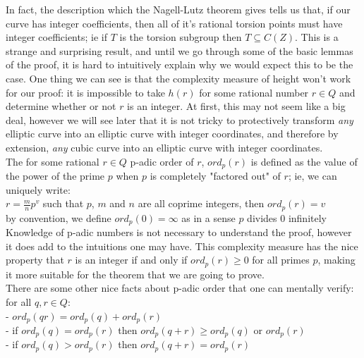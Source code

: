 \documentclass{article}
\begin{document}
In fact, the description which the Nagell-Lutz theorem gives tells us that, if our curve has integer coefficients, then all of it's rational torsion points must have integer coefficients; ie if $T$ is the torsion subgroup then $T \subseteq C(Z)$. This is a strange and surprising result, and until we go through some of the basic lemmas of the proof, it is hard to intuitively explain why we would expect this to be the case. One thing we can see is that the complexity measure of height won't work for our proof: it is impossible to take $h(r)$ for some rational number $r \in Q$ and determine whether or not $r$ is an integer. At first, this may not seem like a big deal, however we will see later that it is not tricky to protectively transform \emph{any} elliptic curve into an elliptic curve with integer coordinates, and therefore by extension, \emph{any} cubic curve into an elliptic curve with integer coordinates.\\

The for some rational $r \in Q$ p-adic order of $r$, $ord_p(r)$ is defined as the value of the power of the prime $p$ when $p$ is completely "factored out" of $r$; ie, we can uniquely write:\\

$r = \frac{m}{n}p^v$ such that $p$, $m$ and $n$ are all coprime integers, then $ord_p(r) = v$\\

by convention, we define $ord_p(0) = \infty$ as in a sense $p$ divides $0$ infinitely\\

Knowledge of p-adic numbers is not necessary to understand the proof, however it does add to the intuitions one may have. This complexity measure has the nice property that $r$ is an integer if and only if $ord_p(r) \geq 0$ for all primes $p$, making it more suitable for the theorem that we are going to prove. \\

There are some other nice facts about p-adic order that one can mentally verify:\\

for all $q, r \in Q$:\\

- $ord_p(qr) = ord_p(q) + ord_p(r)$\\

- if $ord_p(q) = ord_p(r)$ then $ord_p(q + r)  \geq ord_p(q)$ or $ord_p(r)$\\

- if $ord_p(q) > ord_p(r)$ then $ord_p(q + r) = ord_p(r)$\\
\end{document}
